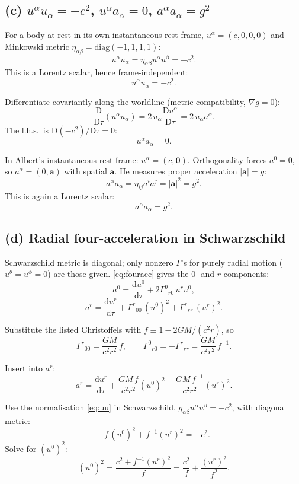 \documentclass[11pt]{article}
\newcommand{\D}{\mathrm{D}}
\newcommand{\de}{\mathrm{d}}
\begin{document}
\subsection*{(c) $u^\alpha u_\alpha = -c^2$, $u^\alpha a_\alpha = 0$, $a^\alpha a_\alpha = g^2$}

For a body at rest in its own instantaneous rest frame, $u^\alpha = (c,0,0,0)$ and Minkowski metric $\eta_{\alpha\beta}=\text{diag}(-1,1,1,1)$:
\[
u^\alpha u_\alpha = \eta_{\alpha\beta} u^\alpha u^\beta = -c^2.
\]
This is a Lorentz scalar, hence frame-independent:
\[
\boxed{\;u^\alpha u_\alpha = -c^2.\;}
\label{eq:uu}
\]

Differentiate covariantly along the worldline (metric compatibility, $\nabla g = 0$):
\[
\frac{\D}{\D\tau}(u^\alpha u_\alpha) = 2\,u_\alpha\frac{\D u^\alpha}{\D\tau} = 2\,u_\alpha a^\alpha.
\]
The l.h.s.\ is $\D(-c^2)/\D\tau = 0$:
\[
\boxed{\;u^\alpha a_\alpha = 0.\;}
\label{eq:uadot}
\]

In Albert's instantaneous rest frame: $u^\alpha = (c,\bm 0)$. Orthogonality forces $a^0 = 0$, so $a^\alpha = (0,\bm a)$ with spatial $\bm a$. He measures proper acceleration $|\bm a| = g$:
\[
a^\alpha a_\alpha = \eta_{ij} a^i a^j = |\bm a|^2 = g^2.
\]
This is again a Lorentz scalar:
\[
\boxed{\;a^\alpha a_\alpha = g^2.\;}
\label{eq:aa}
\]

\subsection*{(d) Radial four-acceleration in Schwarzschild}

Schwarzschild metric is diagonal; only nonzero $\Gamma$'s for purely radial motion ($u^\theta=u^\phi=0$) are those given. \eqref{eq:fouracc} gives the $0$- and $r$-components:
\[
a^0 = \frac{\de u^0}{\de\tau} + 2\Gamma^{0}{}_{r0}\,u^r u^0,
\]
\[
a^r = \frac{\de u^r}{\de\tau} + \Gamma^{r}{}_{00}\,(u^0)^2 + \Gamma^{r}{}_{rr}\,(u^r)^2.
\]

Substitute the listed Christoffels with $f \equiv 1 - 2GM/(c^2 r)$, so
\[
\Gamma^{r}{}_{00} = \frac{GM}{c^2 r^2}\,f,\qquad
\Gamma^{0}{}_{r0} = -\Gamma^{r}{}_{rr} = \frac{GM}{c^2 r^2}\,f^{-1}.
\]

Insert into $a^r$:
\[
a^r = \frac{\de u^r}{\de\tau} + \frac{GM\,f}{c^2 r^2}(u^0)^2 - \frac{GM\,f^{-1}}{c^2 r^2}(u^r)^2.
\]

Use the normalisation \eqref{eq:uu} in Schwarzschild, $g_{\alpha\beta}u^\alpha u^\beta = -c^2$, with diagonal metric:
\[
-f\,(u^0)^2 + f^{-1}(u^r)^2 = -c^2.
\]
Solve for $(u^0)^2$:
\[
(u^0)^2 = \frac{c^2 + f^{-1}(u^r)^2}{f} = \frac{c^2}{f} + \frac{(u^r)^2}{f^2}.
\]
\end{document}
